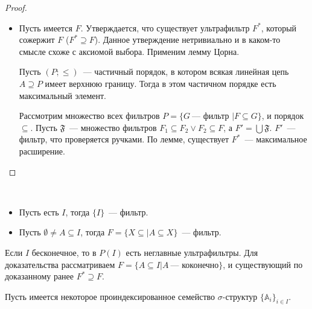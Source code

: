 \begin{proof}
\begin{itemize}
        \item Пусть имеется $F$. Утверждается, что существует ультрафильтр $F^*$, который сожержит $F$ ($F^* \supseteq F$). Данное утверждение нетривиально и в каком-то смысле схоже с аксиомой выбора. Применим лемму Цорна. 
        
        \begin{lemma}[Цорн]
            Пусть $(P; \leq)$~— частичный порядок, в котором всякая линейная цепь $A \supseteq P$ имеет верхнюю границу. Тогда в этом частичном порядке есть максимальный элемент. 
        \end{lemma} 

        Рассмотрим множество всех фильтров $P = \{G~— \text{ фильтр }| F \subseteq G\}$, и порядок $\subseteq$. Пусть $\mathfrak{F}$~— множество фильтров $F_1 \subseteq F_2 \vee F_2 \subseteq F$, а $F' = \bigcup \mathfrak{F}$. $F'$~— фильтр, что проверяется ручками. По лемме, существует $F^*$~— максимальное расширение. 
    \end{itemize}
\end{proof} 

\begin{exmpl} \ 
    \begin{itemize}
        \item Пусть есть $I$, тогда $\{I\}$~— фильтр. 
        \item Пусть $\emptyset \neq A \subseteq I$, тогда $F = \{X \subseteq | A \subseteq X\}$~— фильтр.
    \end{itemize}
\end{exmpl}

\begin{task}
    Если $I$ бесконечное, то в $P(I)$ есть неглавные ультрафильтры. Для доказательства рассматриваем $F = \{A \subseteq I | A~— \text{ коконечно}\}$, и существующий по доказанному ранее $F^* \supseteq F$. 
\end{task} 

Пусть имеется некоторое проиндексированное семейство $\sigma$-структур $\{\mathbb{A}_i\}_{i \in I}$.  

